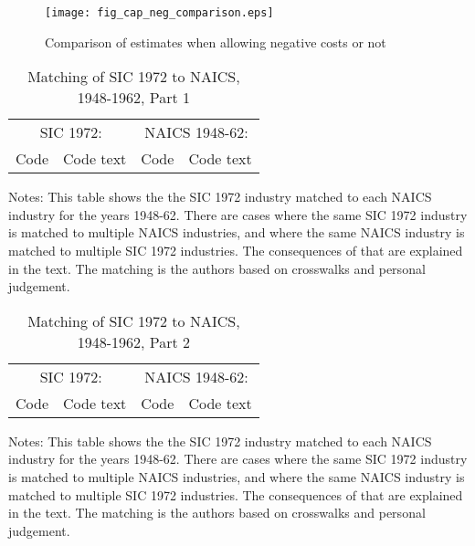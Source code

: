\documentclass[11pt]{article}
\begin{document}
\begin{figure}[!htb]
\begin{center}
\caption{Comparison of estimates when allowing negative costs or not}
\label{FIG_neg_costs}
\texttt{[image: fig\_cap\_neg\_comparison.eps]}
\end{center}
\vspace{-.5cm}
\end{figure}


\begin{table}[!htb]
\begin{center}
\label{TAB_match1}
\caption{Matching of SIC 1972 to NAICS, 1948-1962, Part 1}
{\footnotesize
\begin{tabular}{llll}
\midrule
\multicolumn{2}{c}{SIC 1972:} & \multicolumn{2}{c}{NAICS 1948-62:} \\ \cmidrule(lr){1-2} \cmidrule(lr){3-4}
Code  & Code text  & Code & Code text \\ 
\midrule

\midrule
\end{tabular}
}
\end{center}
{\footnotesize Notes: This table shows the the SIC 1972 industry matched to each NAICS industry for the years 1948-62. There are cases where the same SIC 1972 industry is matched to multiple NAICS industries, and where the same NAICS industry is matched to multiple SIC 1972 industries. The consequences of that are explained in the text. The matching is the authors based on crosswalks and personal judgement.}
\end{table}


\begin{table}[!htb]
\begin{center}
\label{TAB_match2}
\caption{Matching of SIC 1972 to NAICS, 1948-1962, Part 2}
{\footnotesize
\begin{tabular}{llll}
\midrule
\multicolumn{2}{c}{SIC 1972:} & \multicolumn{2}{c}{NAICS 1948-62:} \\ \cmidrule(lr){1-2} \cmidrule(lr){3-4}
Code  & Code text  & Code & Code text \\ 
\midrule

\midrule
\end{tabular}
}
\end{center}
{\footnotesize Notes: This table shows the the SIC 1972 industry matched to each NAICS industry for the years 1948-62. There are cases where the same SIC 1972 industry is matched to multiple NAICS industries, and where the same NAICS industry is matched to multiple SIC 1972 industries. The consequences of that are explained in the text. The matching is the authors based on crosswalks and personal judgement.}
\end{table}
\end{document}
